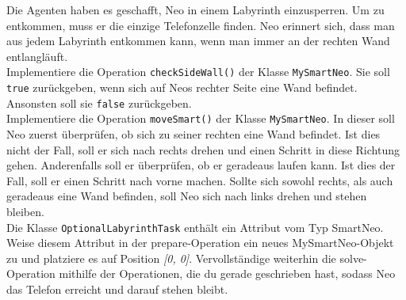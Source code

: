 	Die Agenten haben es geschafft, Neo in einem Labyrinth einzusperren.
	Um zu entkommen, muss er die einzige Telefonzelle finden.
	Neo erinnert sich, dass man aus jedem Labyrinth entkommen kann, wenn man immer an der rechten Wand entlangläuft.\\

		 Implementiere die Operation \lstinline{checkSideWall()} der Klasse \lstinline{MySmartNeo}.
		Sie soll \lstinline{true} zurückgeben, wenn sich auf Neos rechter Seite eine Wand befindet.
		Ansonsten soll sie \lstinline{false} zurückgeben.\\



		 Implementiere die Operation \lstinline{moveSmart()} der Klasse \lstinline{MySmartNeo}.
		In dieser soll Neo zuerst überprüfen, ob sich zu seiner rechten eine Wand befindet.
		Ist dies nicht der Fall, soll er sich nach rechts drehen und einen Schritt in diese Richtung gehen.
		Anderenfalls soll er überprüfen, ob er geradeaus laufen kann. Ist dies der Fall, soll er einen Schritt nach vorne machen.
		Sollte sich sowohl rechts, als auch geradeaus eine Wand befinden, soll Neo sich nach links drehen und stehen bleiben.\\

		 Die Klasse \lstinline{OptionalLabyrinthTask} enthält ein Attribut vom Typ SmartNeo.
		Weise diesem Attribut in der prepare-Operation ein neues MySmartNeo-Objekt zu und
		platziere es auf Position \emph{[0, 0]}.
		Vervollständige weiterhin die solve-Operation mithilfe der Operationen,
		die du gerade geschrieben hast, sodass Neo das Telefon erreicht und darauf stehen bleibt.

		

	